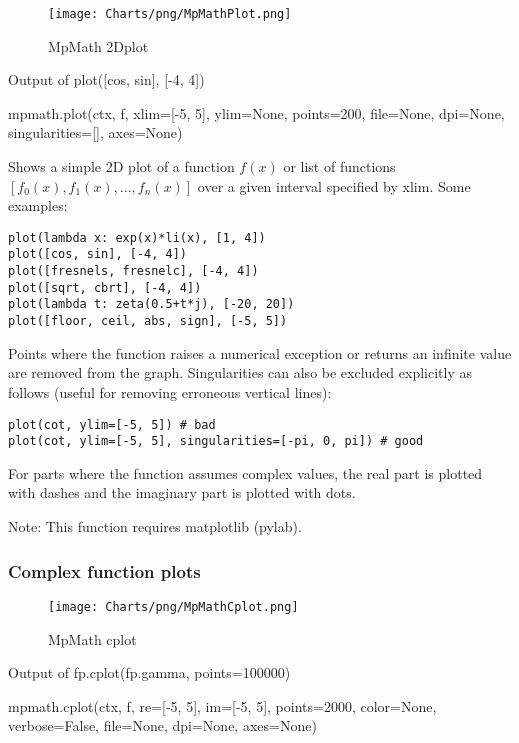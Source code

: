 \begin{figure}[ht]
	\centering
	\texttt{[image: Charts/png/MpMathPlot.png]}
	\caption{MpMath 2Dplot}
	\label{Fig MpMath 2Dplot}
\end{figure}


Output of plot([cos, sin], [-4, 4])

\vpara
mpmath.plot(ctx, f, xlim=[-5, 5], ylim=None, points=200, file=None, dpi=None, singularities=[], axes=None)

\vpara
Shows a simple 2D plot of a function $f(x)$ or list of functions $[f_0(x),f_1(x),\ldots,f_n(x)]$ over a given interval specified by xlim. Some examples:

\begin{lstlisting}
plot(lambda x: exp(x)*li(x), [1, 4])
plot([cos, sin], [-4, 4])
plot([fresnels, fresnelc], [-4, 4])
plot([sqrt, cbrt], [-4, 4])
plot(lambda t: zeta(0.5+t*j), [-20, 20])
plot([floor, ceil, abs, sign], [-5, 5])
\end{lstlisting}


Points where the function raises a numerical exception or returns an infinite value are removed from the graph. Singularities can also be excluded explicitly as follows (useful
for removing erroneous vertical lines):

\begin{lstlisting}
plot(cot, ylim=[-5, 5]) # bad
plot(cot, ylim=[-5, 5], singularities=[-pi, 0, pi]) # good
\end{lstlisting}


For parts where the function assumes complex values, the real part is plotted with dashes and the imaginary part is plotted with dots.

Note: This function requires matplotlib (pylab).

\newpage
\subsubsection{Complex function plots}

\begin{figure}[ht]
	\centering
	\texttt{[image: Charts/png/MpMathCplot.png]}
	\caption{MpMath cplot}
	\label{Fig MpMath cplot}
\end{figure}



Output of fp.cplot(fp.gamma, points=100000)

\vpara
mpmath.cplot(ctx, f, re=[-5, 5], im=[-5, 5], points=2000, color=None, verbose=False, file=None, dpi=None, axes=None)

